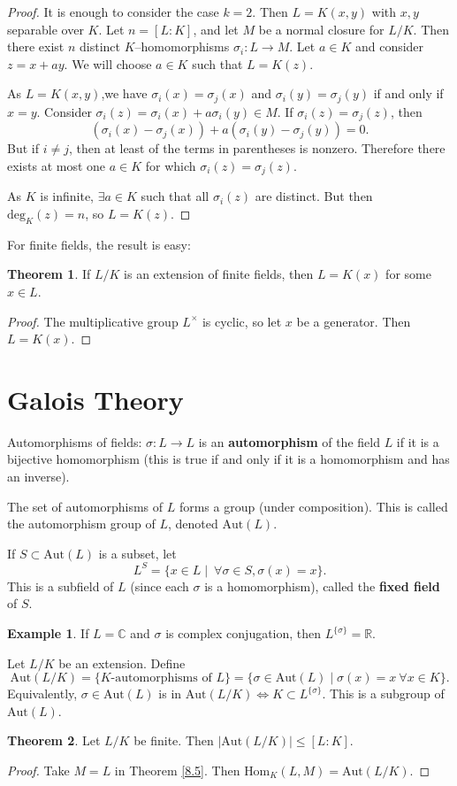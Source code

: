 \documentclass{article}
\theoremstyle{definition}
\newtheorem{theorem}{Theorem}[section]
\newtheorem{example}{Example}[section]
\begin{document}
\begin{proof}
    It is enough to consider the case $k=2$. Then $L=K(x,y)$ with $x,y$ separable over $K$. Let $n=[L:K]$, and let $M$ be a normal closure for $L/K$. Then there exist $n$ distinct $K$--homomorphisms $\sigma_i : L \to M$. Let $a \in K$ and consider $z=x+ay$. We will choose $a \in K$ such that $L=K(z)$.

    As $L=K(x,y)$,we have $\sigma_i(x)=\sigma_j(x)$ and $\sigma_i(y)=\sigma_j(y)$ if and only if $x=y$. Consider $\sigma_i(z)=\sigma_i(x) + a \sigma_i(y) \in M$. If $\sigma_i(z)=\sigma_j(z)$, then $$(\sigma_i(x)-\sigma_j(x))+a(\sigma_i(y)-\sigma_j(y))=0.$$ But if $i\neq j$, then at least of the terms in parentheses is nonzero. Therefore there exists at most one $a \in K$ for which $\sigma_i(z)=\sigma_j(z)$.

    As $K$ is infinite, $\exists a \in K$ such that all $\sigma_i(z)$ are distinct. But then $\text{deg}_K(z) = n$, so $L=K(z)$.
\end{proof}
For finite fields, the result is easy:
\begin{theorem}
    If $L/K$ is an extension of finite fields, then $L=K(x)$ for some $x \in L$.
\end{theorem}
\begin{proof}
    The multiplicative group $L^\times$ is cyclic, so let $x$ be a generator. Then $L=K(x)$.
\end{proof}
\section{Galois Theory}
Automorphisms of fields: $\sigma : L \to L$ is an \textbf{automorphism} of the field $L$ if it is a bijective homomorphism (this is true if and only if it is a homomorphism and has an inverse).

The set of automorphisms of $L$ forms a group (under composition). This is called the automorphism group of $L$, denoted $\text{Aut}(L)$.

If $S \subset \text{Aut}(L)$ is a subset, let \[
L^S = \{ x \in L \mid ~\forall \sigma \in S, \sigma(x)=x\}.
\]
This is a subfield of $L$ (since each $\sigma$ is a homomorphism), called the \textbf{fixed field} of $S$.
\begin{example}
    If $L=\mathbb{C}$ and $\sigma$ is complex conjugation, then $L^{\{\sigma\}}=\mathbb{R}$.
\end{example}
Let $L/K$ be an extension. Define \[
\text{Aut}(L/K)= \{K\text{-automorphisms of }L\} = \{\sigma \in \text{Aut}(L) \mid \sigma(x)=x ~\forall x \in K\}.
\]
Equivalently, $\sigma \in \text{Aut}(L)$ is in $\text{Aut}(L/K) \iff K \subset L^{\{\sigma\}}$. This is a subgroup of $\text{Aut}(L)$.
\begin{theorem}\label{9.1}
    Let $L/K$ be finite. Then $|\text{Aut}(L/K)| \le [L:K]$.
\end{theorem}
\begin{proof}
    Take $M=L$ in Theorem \ref{8.5}. Then $\text{Hom}_K(L,M) = \text{Aut}(L/K)$.
\end{proof}
\end{document}
